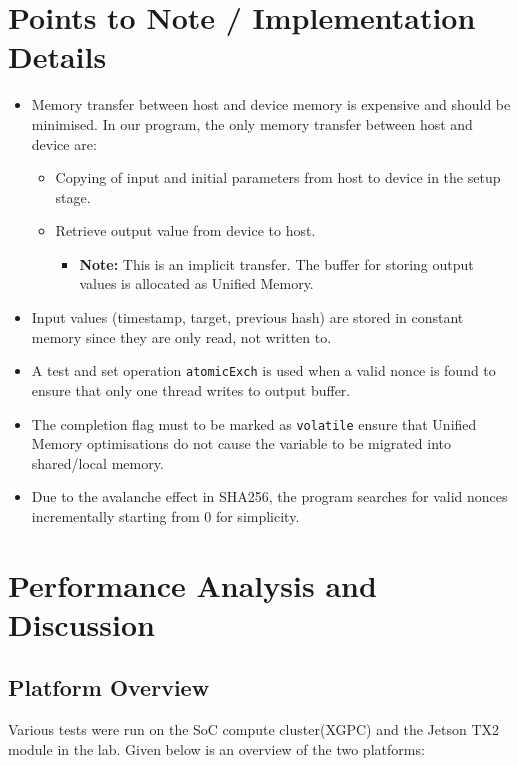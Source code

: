\documentclass[a4paper,12pt]{article}
\begin{document}
\section{Points to Note / Implementation Details}
\begin{itemize}
	\item Memory transfer between host and device memory is expensive and should be minimised. In our program, the only memory transfer between host and device are:
  \begin{itemize}
    \item Copying of input and initial parameters from host to device in the setup stage.
    \item Retrieve output value from device to host.
    \begin{itemize}
      \item \textbf{Note:} This is an implicit transfer. The buffer for storing output values is allocated as Unified Memory.
    \end{itemize}
  \end{itemize}
  \item Input values (timestamp, target, previous hash) are stored in constant memory since they are only read, not written to.
  \item A test and set operation \texttt{atomicExch} is used when a valid nonce is found to ensure that only one thread writes to output buffer.
  \item The completion flag must to be marked as \texttt{volatile} ensure that Unified Memory optimisations do not cause the variable to be migrated into shared/local memory.
  \item Due to the avalanche effect in SHA256, the program searches for valid nonces incrementally starting from 0 for simplicity.
\end{itemize}

\section{Performance Analysis and Discussion}

\subsection{Platform Overview}

Various tests were run on the SoC compute cluster(XGPC) and the Jetson TX2 module in the lab. Given below is an overview of the two platforms:
\end{document}
